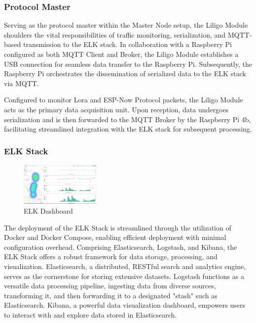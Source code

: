 \subsubsection{Protocol Master}\label{sec:protocol}

Serving as the protocol master within the Master Node setup, the Liligo Module shoulders the vital responsibilities of traffic monitoring, serialization, and MQTT-based transmission to the ELK stack. In collaboration with a Raspberry Pi configured as both MQTT Client and Broker, the Liligo Module establishes a USB connection for seamless data transfer to the Raspberry Pi. Subsequently, the Raspberry Pi orchestrates the dissemination of serialized data to the ELK stack via MQTT.

Configured to monitor Lora and ESP-Now Protocol packets, the Liligo Module acts as the primary data acquisition unit. Upon reception, data undergoes serialization and is then forwarded to the MQTT Broker by the Raspberry Pi 4b, facilitating streamlined integration with the ELK stack for subsequent processing.

\subsubsection{ELK Stack}\label{sec:elk}
\begin{figure}[H]
  \begin{center}
    \includegraphics[width=0.35\textwidth]{./Figures/elk/elk_dashboard.png}
  \end{center}
  \caption{ELK Dashboard}\label{fig:elk_dashboard}
\end{figure}

The deployment of the ELK Stack is streamlined through the utilization of Docker and Docker Compose, enabling efficient deployment with minimal configuration overhead. Comprising Elasticsearch, Logstash, and Kibana, the ELK Stack offers a robust framework for data storage, processing, and visualization. Elasticsearch, a distributed, RESTful search and analytics engine, serves as the cornerstone for storing extensive datasets. Logstash functions as a versatile data processing pipeline, ingesting data from diverse sources, transforming it, and then forwarding it to a designated "stash" such as Elasticsearch. Kibana, a powerful data visualization dashboard, empowers users to interact with and explore data stored in Elasticsearch.

